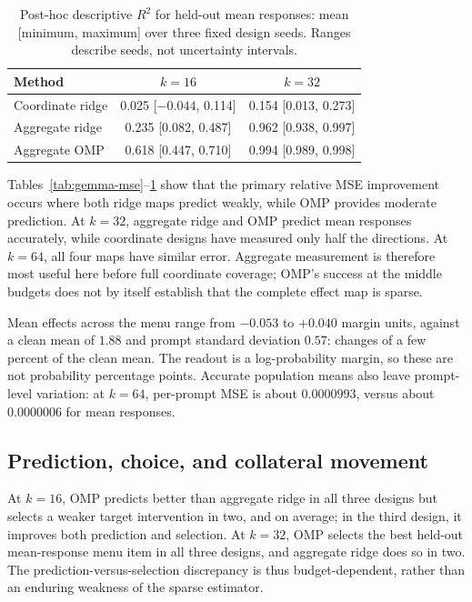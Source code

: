 \begin{table}[t]
\centering
\begin{tabular}{lcc}
\toprule
Method & $k=16$ & $k=32$ \\
\midrule
Coordinate ridge & 0.025 [$-0.044$, 0.114] & 0.154 [0.013, 0.273] \\
Aggregate ridge & 0.235 [0.082, 0.487] & 0.962 [0.938, 0.997] \\
Aggregate OMP & 0.618 [0.447, 0.710] & 0.994 [0.989, 0.998] \\
\bottomrule
\end{tabular}
\caption{Post-hoc descriptive $R^2$ for held-out mean responses: mean [minimum, maximum] over three fixed design seeds. Ranges describe seeds, not uncertainty intervals.}
\label{tab:gemma-r2}
\end{table}

Tables~\ref{tab:gemma-mse}--\ref{tab:gemma-r2} show that the primary relative MSE improvement occurs where both ridge maps predict weakly, while OMP provides moderate prediction. At $k=32$, aggregate ridge and OMP predict mean responses accurately, while coordinate designs have measured only half the directions. At $k=64$, all four maps have similar error. Aggregate measurement is therefore most useful here before full coordinate coverage; OMP's success at the middle budgets does not by itself establish that the complete effect map is sparse.

Mean effects across the menu range from $-0.053$ to $+0.040$ margin units, against a clean mean of $1.88$ and prompt standard deviation $0.57$: changes of a few percent of the clean mean. The readout is a log-probability margin, so these are not probability percentage points. Accurate population means also leave prompt-level variation: at $k=64$, per-prompt MSE is about $0.0000993$, versus about $0.0000006$ for mean responses.

\subsection{Prediction, choice, and collateral movement}

At $k=16$, OMP predicts better than aggregate ridge in all three designs but selects a weaker target intervention in two, and on average; in the third design, it improves both prediction and selection. At $k=32$, OMP selects the best held-out mean-response menu item in all three designs, and aggregate ridge does so in two. The prediction-versus-selection discrepancy is thus budget-dependent, rather than an enduring weakness of the sparse estimator.

